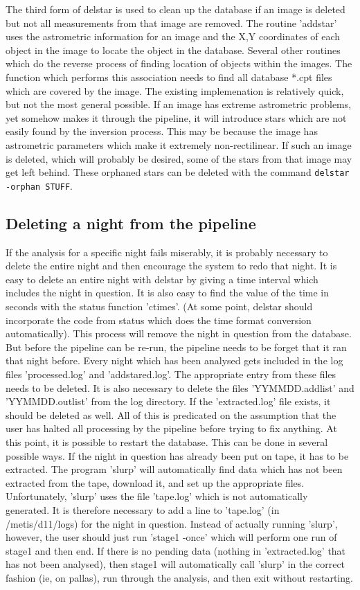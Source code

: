 \documentclass{article}
\begin{document}
The third form of delstar is used to clean up the database if an image
is deleted but not all measurements from that image are removed.  The
routine 'addstar' uses the astrometric information for an image and
the X,Y coordinates of each object in the image to locate the object
in the database.  Several other routines which do the reverse process of
finding location of objects within the images.  The function which
performs this association needs to find all database *.cpt files which
are covered by the image.  The existing implemenation is relatively
quick, but not the most general possible.  If an image has extreme
astrometric problems, yet somehow makes it through the pipeline, it
will introduce stars which are not easily found by the inversion
process.  This may be because the image has astrometric parameters
which make it extremely non-rectilinear.  If such an image is deleted,
which will probably be desired, some of the stars from that image may
get left behind.  These orphaned stars can be deleted with the command
{\tt delstar -orphan STUFF}.

\subsection{Deleting a night from the pipeline}

If the analysis for a specific night fails miserably, it is probably
necessary to delete the entire night and then encourage the system to
redo that night.  It is easy to delete an entire night with delstar by
giving a time interval which includes the night in question.  It is
also easy to find the value of the time in seconds with the status
function 'ctimes'.  (At some point, delstar should incorporate the
code from status which does the time format conversion automatically).
This process will remove the night in question from the database.  But
before the pipeline can be re-run, the pipeline needs to be forget
that it ran that night before.  Every night which has been analysed
gets included in the log files 'processed.log' and 'addstared.log'.
The appropriate entry from these files needs to be deleted.  It is
also necessary to delete the files 'YYMMDD.addlist' and
'YYMMDD.outlist' from the log directory.  If the 'extracted.log' file
exists, it should be deleted as well.  All of this is predicated on
the assumption that the user has halted all processing by the pipeline
before trying to fix anything.  At this point, it is possible to
restart the database.  This can be done in several possible ways.  If
the night in question has already been put on tape, it has to be
extracted.  The program 'slurp' will automatically find data which has
not been extracted from the tape, download it, and set up the
appropriate files.  Unfortunately, 'slurp' uses the file 'tape.log'
which is not automatically generated.  It is therefore necessary to
add a line to 'tape.log' (in /metis/d11/logs) for the night in
question.  Instead of actually running 'slurp', however, the user
should just run 'stage1 -once' which will perform one run of stage1
and then end.  If there is no pending data (nothing in 'extracted.log'
that has not been analysed), then stage1 will automatically call
'slurp' in the correct fashion (ie, on pallas), run through the
analysis, and then exit without restarting.
\end{document}

